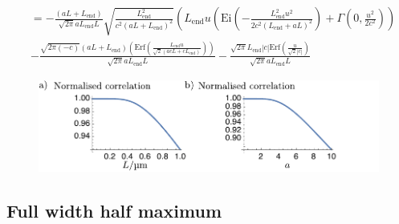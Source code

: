 \begin{align*}
&=-\frac{(a L+L_{\text{end}})}{\sqrt{2 \pi } a L_{\text{end}} L}\sqrt{\frac{L_{\text{end}}^2}{c^2 (a L+L_{\text{end}})^2}}\left(L_{\text{end}} u \left(\text{Ei}\left(-\frac{L_{\text{end}}^2 u^2}{2 c^2 (L_{\text{end}}+a L)^2}\right)+\Gamma \left(0,\frac{u^2}{2 c^2}\right)\right)\right.\\
&-\frac{\sqrt{2 \pi (-c)} (a L+L_{\text{end}}) \left(\text{Erf} \left(\frac{L_{\text{end}} u}{\sqrt{2} (a c L+c L_{\text{end}})}\right)\right)}{\sqrt{2 \pi } a L_{\text{end}} L}-\frac{\sqrt{2 \pi } L_{\text{end}} \left| c\right|  \text{Erf} \left(\frac{u}{\sqrt{2} \left| c\right| } \right)}{\sqrt{2 \pi } a L_{\text{end}} L}
\end{align*}

\begin{figure}
  \centering
  \includegraphics{./mathematica/correlation_analysis}
  \caption{}
  \label{fig:correlation_analysis}
\end{figure}

\subsection{Full width half maximum}


